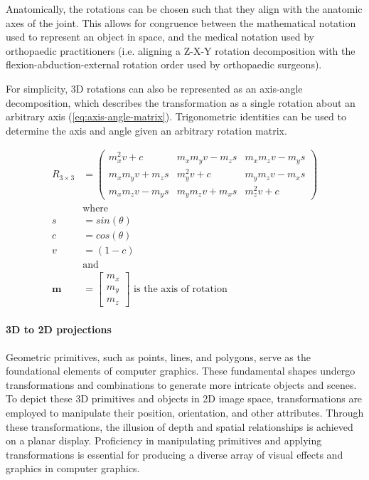 Anatomically, the rotations can be chosen such that they align with the anatomic axes of the joint.
This allows for congruence between the mathematical notation used to represent an object in space, and the medical notation used by orthopaedic practitioners (i.e. aligning a Z-X-Y rotation decomposition with the flexion-abduction-external rotation order used by orthopaedic surgeons).

For simplicity, 3D rotations can also be represented as an axis-angle decomposition, which describes the transformation as a single rotation about an arbitrary axis \cite{craneKinematicAnalysisRobot2008} (\cref{eq:axis-angle-matrix}).
Trigonometric identities can be used to determine the axis and angle given an arbitrary rotation matrix.

\begin{equation}
    \begin{aligned}
        R_{3 \times 3} &= \begin{pmatrix}
            m_x^2v + c & m_xm_yv - m_zs & m_x m_z v - m_y s \\ m_x m_y v + m_z s & m_y^2 v + c & m_y m_z v - m_x s \\ m_x m_z v - m_y s & m_y m_z v + m_x s & m_z^2 v + c
        \end{pmatrix}\\
        &\text{where} \\
        s &= sin(\theta)\\
        c &= cos(\theta) \\
        v &= (1 - c) \\
        &\text{and}\\
        \mathbf{m} &= \begin{bmatrix}
            m_x \\ m_y \\ m_z
        \end{bmatrix} \text{ is the axis of rotation}
    \end{aligned}
    \label{eq:axis-angle-matrix}
\end{equation}



\paragraph*{3D to 2D projections}
Geometric primitives, such as points, lines, and polygons, serve as the foundational elements of computer graphics.
These fundamental shapes undergo transformations and combinations to generate more intricate objects and scenes.
To depict these 3D primitives and objects in 2D image space, transformations are employed to manipulate their position, orientation, and other attributes.
Through these transformations, the illusion of depth and spatial relationships is achieved on a planar display.
Proficiency in manipulating primitives and applying transformations is essential for producing a diverse array of visual effects and graphics in computer graphics.

